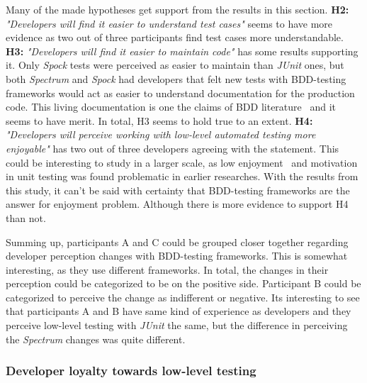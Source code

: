 Many of the made hypotheses get support from the results in this section.
\textbf{H2:} \textit{"Developers will find it easier to understand test cases"} seems to have more evidence as two out of
three participants find test cases more understandable. \textbf{H3:} \textit{"Developers will find it easier to maintain code"}
has some results supporting it. Only \textit{Spock} tests were perceived as easier to maintain than \textit{JUnit} ones, but both \textit{Spectrum}
and \textit{Spock} had developers that felt new tests with BDD-testing frameworks would act as easier to understand documentation for the
production code. This living documentation is one the claims of BDD literature~\cite{smart2014bdd} and it seems to have
merit. In total, H3 seems to hold true to an extent.
\textbf{H4:} \textit{"Developers will perceive working with low-level automated testing more enjoyable"} has two out
of three developers agreeing with the statement. This could be interesting to study in a larger scale, as low enjoyment~\cite{daka2014survey}
and motivation~\cite{runeson2006survey} in unit testing was found problematic in earlier researches. With the results from
this study, it can't be said with certainty that BDD-testing frameworks are the answer for enjoyment problem. Although
there is more evidence to support H4 than not.


Summing up, participants A and C could be grouped closer together regarding developer perception changes with BDD-testing
frameworks. This is somewhat interesting, as they use different frameworks. In total, the changes in their perception could be categorized
to be on the positive side. Participant B could be categorized to perceive the change as indifferent or negative. Its interesting
to see that participants A and B have same kind of experience as developers and they perceive low-level testing with \textit{JUnit} the same,
but the difference in perceiving the \textit{Spectrum} changes was quite different.


\subsubsection{Developer loyalty towards low-level testing}

